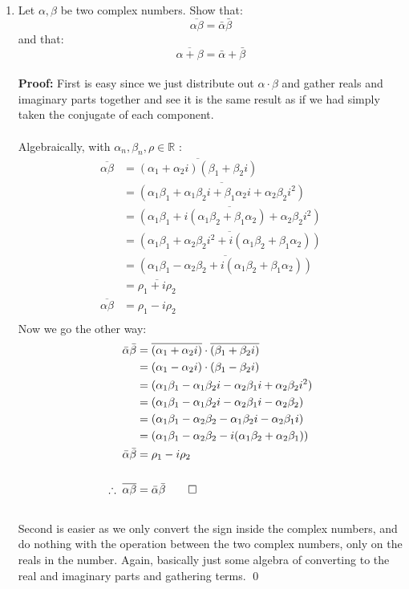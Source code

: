 \begin{enumerate}
	\item Let $\alpha, \beta$ be two complex numbers. Show that: 
	$$\overline{\alpha \beta} = \bar{\alpha}\bar{\beta}$$ 
	and that:
	$$ \overline{\alpha + \beta} = \bar{\alpha} + \bar{\beta}$$
	\\
	\textbf{Proof:}
	First is easy since we just distribute out $\alpha\cdot\beta$ and gather reals and imaginary parts together and see it is the same result as if we had simply taken the conjugate of each component.\\
	\\ 
	Algebraically, with $\alpha_n, \beta_n, \rho \in \mathbb{R}$ :
	\begin{align*}
		\overline{\alpha \beta} &= \overline{(\alpha_1 + \alpha_2 i)(\beta_1 + \beta_2 i)} \\
		&= \overline{(\alpha_1\beta_1  + \alpha_1\beta_2 i + \beta_1 \alpha_2 i + \alpha_2 \beta_2 i^2)} \\
		&= \overline{(\alpha_1\beta_1  + i(\alpha_1\beta_2 + \beta_1 \alpha_2) + \alpha_2 \beta_2 i^2)} \\
		&= \overline{(\alpha_1\beta_1 + \alpha_2 \beta_2 i^2 + i(\alpha_1\beta_2 + \beta_1 \alpha_2))} \\
		&= \overline{(\alpha_1\beta_1 - \alpha_2 \beta_2 + i(\alpha_1\beta_2 + \beta_1 \alpha_2))} \\
		&= \overline{\rho_1  + i\rho_2} \\
		\overline{\alpha \beta} &= \rho_1  - i\rho_2 \\
	\end{align*}
	Now we go the other way:
	\begin{align*}
		\bar{\alpha}\bar{\beta} &= \overline{(\alpha_1 + \alpha_2 i)} \cdot \overline{(\beta_1 + \beta_2 i)} \\
		&= (\alpha_1 - \alpha_2 i) \cdot (\beta_1 - \beta_2 i) \\
		&= (\alpha_1\beta_1 - \alpha_1\beta_2i -\alpha_2\beta_1 i + \alpha_2\beta_2 i^2 ) \\
		&= (\alpha_1\beta_1 - \alpha_1\beta_2i -\alpha_2\beta_1 i - \alpha_2\beta_2 ) \\
		&= (\alpha_1\beta_1 - \alpha_2\beta_2 - \alpha_1\beta_2i -\alpha_2\beta_1 i ) \\
		&= (\alpha_1\beta_1 - \alpha_2\beta_2 - i(\alpha_1\beta_2 + \alpha_2\beta_1) ) \\
		\bar{\alpha}\bar{\beta} &= \rho_1 - i\rho_2 \\
		\\
		\therefore \;  \overline{\alpha\beta} &= \bar{\alpha}\bar{\beta} \qed
	\end{align*}
	\\
	Second is easier as we only convert the sign inside the complex numbers, and do nothing with the operation between the two complex numbers, only on the reals in the number. Again, basically just some algebra of converting to the real and imaginary parts and gathering terms. \qed
	

\end{enumerate}
